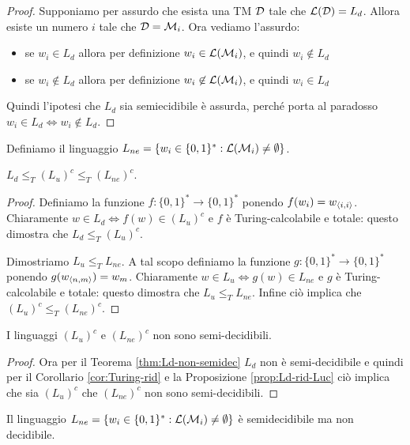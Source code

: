 \documentclass[runningheads,a4paper]{llncs}
\begin{document}
\begin{proof}
Supponiamo per assurdo che esista una TM $\mathcal{D}$ tale che $\mathcal{L}(\mathcal{D}) = L_d$. Allora esiste un numero $i$ tale che $\mathcal{D} = \mathcal{M}_i$. Ora vediamo l'assurdo:
\begin{itemize}
\item se $w_i \in L_d$ allora per definizione $w_i \in \mathcal{L}(\mathcal{M}_i)$, e quindi $w_i \not\in L_d$
\item se $w_i \not\in L_d$ allora per definizione $w_i \not\in \mathcal{L}(\mathcal{M}_i)$, e quindi $w_i \in L_d$
\end{itemize}
Quindi l'ipotesi che $L_d$ sia semiecidibile \`{e} assurda, perch\'{e} porta al paradosso $w_i \in L_d \iff w_i \not\in L_d$.
\end{proof}

Definiamo il linguaggio $L_{ne} =\{w_i \in \{0,1\}^* : \mathcal{L}(\mathcal{M}_i) \neq \emptyset \}$.

\begin{proposition}\label{prop:Ld-rid-Luc}
$L_d \leq_T (L_u)^c \leq_T (L_{ne})^c$.
\end{proposition}

\begin{proof}
Definiamo la funzione $f:\{0,1\}^* \to \{0,1\}^*$ ponendo $f(w_i)= w_{\langle i,i \rangle}$. Chiaramente $w \in L_d \iff f(w) \in (L_u)^c$ e $f$ \`{e} Turing-calcolabile e totale: questo dimostra che $L_d \leq_T (L_u)^c$.

Dimostriamo $L_u \leq_T L_{ne}$. A tal scopo definiamo la funzione $g:\{0,1\}^* \to \{0,1\}^*$ ponendo $g(w_{\langle n,m \rangle})= w_m$. Chiaramente $w \in L_u \iff g(w) \in L_{ne}$ e $g$ \`{e} Turing-calcolabile e totale: questo dimostra che $L_u \leq_T L_{ne}$. Infine ci\`{o} implica che $(L_u)^c \leq_T (L_{ne})^c$.
\end{proof}

\begin{theorem}\label{thm:Lu-non-semidec}
I linguaggi $(L_u)^c$ e $(L_{ne})^c$ non sono semi-decidibili.
\end{theorem}

\begin{proof}
Ora per il Teorema \ref{thm:Ld-non-semidec} $L_d$ non \`{e} semi-decidibile e quindi per il Corollario \ref{cor:Turing-rid} e la Proposizione \ref{prop:Ld-rid-Luc} ci\`{o} implica che sia $(L_u)^c$ che $(L_{ne})^c$ non sono semi-decidibili.
\end{proof}

\begin{theorem}\label{thm:Le-non-semidec}
Il linguaggio $L_{ne} =\{w_i \in \{0,1\}^* : \mathcal{L}(\mathcal{M}_i) \neq \emptyset \}$ \`{e} semidecidibile ma non decidibile.
\end{theorem}
\end{document}
